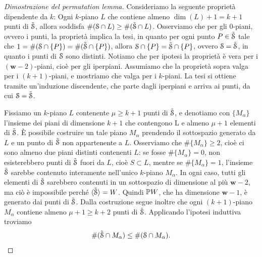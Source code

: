 \begin{proof}[Dimostrazione del permutation lemma]
	Consideriamo la seguente proprietà dipendente da $ k $: Ogni $ k $-piano $ L $ che contiene almeno $ \dim(L) + 1 = k+1
	$ punti di $ \tilde{\mathcal{S}} $, allora soddisfa $ \#(\mathcal{S} \cap L) \ge \#(\tilde{\mathcal{S}} \cap L) $.
	Osserviamo che per gli $ 0 $-piani, ovvero i punti, la proprietà implica la tesi, in quanto per ogni punto $ P \in \tilde{\mathcal{S}} $ tale che $ 1 = \#(\mathcal{S} \cap \{P\} ) = \#(\tilde{\mathcal{S}} \cap \{P\} )$,
	allora $ \mathcal{S} \cap \{P\} = \tilde{\mathcal{S}} \cap \{P\}  $, ovvero $ \mathcal{S} = \tilde{\mathcal{S}} $, in quanto i punti
	di $ \mathcal{S} $ sono distinti. Notiamo che per ipotesi la proprietà è vera per i $ (\bm{w}-2)
	$-piani, cioè per gli iperpiani. Assumiamo che la proprietà
	sopra valga per i $ (k+1) $-piani, e mostriamo che valga per i $ k $-piani. La tesi si ottiene
	tramite un'induzione
	discendente, che parte dagli iperpiani e arriva ai punti, da cui $ \mathcal{S} = \tilde{\mathcal{S}} $.

	Fissiamo un $ k $-piano $ L $ contenente $ \mu \ge  k+1 $
	punti di $ \tilde{\mathcal{S}} $, e denotiamo con $ \{M_\alpha\}  $ l'insieme dei piani di dimensione $ k+1
	$ che contengono L e almeno $ \mu + 1 $ elementi di $ \tilde{\mathcal{S}} $. È possibile costruire un tale
	piano $ M_{\alpha} $ prendendo il sottospazio generato da $ L $ e un punto di $ \tilde{\mathcal{S}} $ non
	appartenente a $ L $.
	Osserviamo che $ \# \{M_{\alpha}\} \ge 2 $, cioè ci sono almeno due piani distinti contenenti $ L
	$: se fosse $ \#\{M_{\alpha}\} =0 $, non esisterebbero punti di $ \tilde{\mathcal{S}} $ fuori da $ L $,
	cioè $ S \subset L$, mentre se $ \# \{M_{\alpha}\} = 1  $, l'insieme $ \tilde{\mathcal{S}} $ sarebbe contenuto
	interamente nell'unico $ k $-piano $ M_{\alpha} $. In ogni caso, tutti gli elementi di $
		\tilde{\mathcal{S}} $ sarebbero contenuti in un sottospazio di dimensione al più $
		\bm{w} - 2 $, ma ciò è impossibile perché $ \angb{\tilde{\s}} = W $. Quindi $ \mathbb{P} W $, che ha
	dimensione $ \bm{w} -1 $, è generato
	dai punti di $ \tilde{\mathcal{S}} $. Dalla costruzione segue inoltre che ogni
	$(k+1)$-piano $ M_{\alpha} $ contiene almeno $ \mu + 1 \ge k+2 $
	punti di $ \tilde{\mathcal{S}} $. Applicando l'ipotesi induttiva troviamo
	\begin{equation}
		\label{eq:malpha}
		\#(\tilde{\mathcal{S}} \cap M_{\alpha}) \le \#(\mathcal{S} \cap M_{\alpha}).
	\end{equation}


\end{proof}
